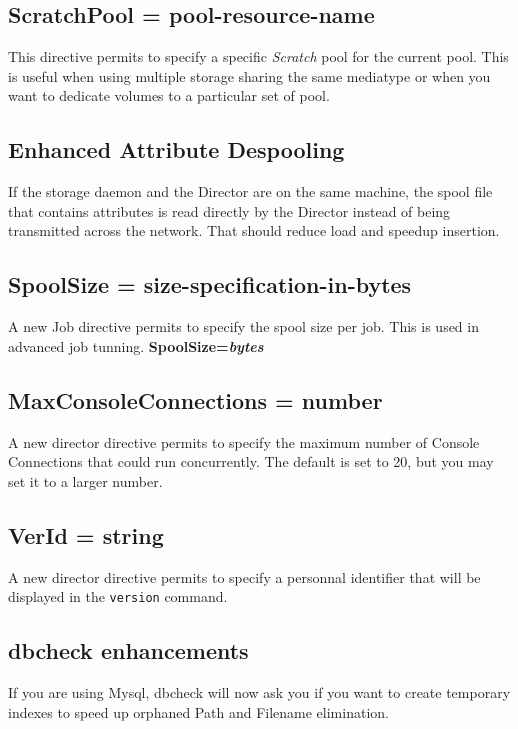 \subsection{ScratchPool = \lt{}pool-resource-name\gt{}}
This directive permits to specify a specific \textsl{Scratch} pool for the
current pool. This is useful when using multiple storage sharing the same
mediatype or when you want to dedicate volumes to a particular set of pool.

\subsection{Enhanced Attribute Despooling}
If the storage daemon and the Director are on the same machine, the spool file
that contains attributes is read directly by the Director instead of being
transmitted across the network. That should reduce load and speedup insertion.

\subsection{SpoolSize = \lt{}size-specification-in-bytes\gt{}}
A new Job directive permits to specify the spool size per job. This is used
in advanced job tunning. {\bf SpoolSize={\it bytes}}

\subsection{MaxConsoleConnections = \lt{}number\gt{}}
A new director directive permits to specify the maximum number of Console
Connections that could run concurrently. The default is set to 20, but you may
set it to a larger number.

\subsection{VerId = \lt{}string\gt{}}
A new director directive permits to specify a personnal identifier that will be
displayed in the \texttt{version} command.

\subsection{dbcheck enhancements}
If you are using Mysql, dbcheck will now ask you if you want to create
temporary indexes to speed up orphaned Path and Filename elimination. 

